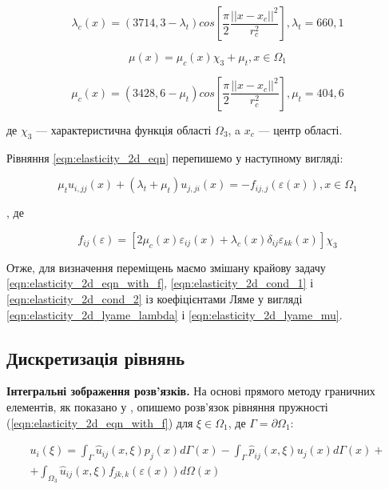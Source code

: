 \begin{equation*}
    \lambda_c(x) = (3714,3 - \lambda_t)cos\left[\frac{\pi}{2}\frac{||x-x_c||^2}{r_c^2}\right], \lambda_t = 660,1
\end{equation*}

\begin{equation}
    \label{eqn:elasticity_2d_lyame_mu}
    \mu(x) = \mu_c(x)\chi_3 + \mu_t, x \in \Omega_1
\end{equation}

\begin{equation*}
    \mu_c(x) = (3428,6 - \mu_t)cos\left[\frac{\pi}{2}\frac{||x-x_c||^2}{r_c^2}\right], \mu_t = 404,6
\end{equation*}

\noindent де $\chi_3$ --- характеристична функція області $\Omega_3$, a $x_c$ --- центр області.

Рівняння \ref{eqn:elasticity_2d_eqn} перепишемо у наступному вигляді:

\begin{equation}
    \label{eqn:elasticity_2d_eqn_with_f}
    \mu_t u_{i,jj}(x) + (\lambda_t + \mu_t)u_{j,ji}(x) = -f_{ij,j}(\varepsilon(x)), x \in \Omega_1
\end{equation}

\noindent, де

\begin{equation*}
    f_{ij}(\varepsilon) = [ 2\mu_c(x)\varepsilon_{ij}(x) + \lambda_c(x) \delta_{ij} \varepsilon_{kk}(x) ] \chi_3
\end{equation*}

Отже, для визначення переміщень маємо змішану крайову задачу \ref{eqn:elasticity_2d_eqn_with_f},
\ref{eqn:elasticity_2d_cond_1} і \ref{eqn:elasticity_2d_cond_2} із коефіцієнтами Ляме у вигляді
\ref{eqn:elasticity_2d_lyame_lambda} і \ref{eqn:elasticity_2d_lyame_mu}.

\subsection{Дискретизація рівнянь}

\textbf{Інтегральні зображення розв'язків.} На основі прямого методу граничних елементів, як показано у
\cite{brebbia-bem}, опишемо розв'язок рівняння пружності (\ref{eqn:elasticity_2d_eqn_with_f}) для $\xi \in \Omega_1$, де
$\Gamma = \partial\Omega_1$:

\begin{equation}
    \label{eqn:elasticity_2d_bem_direct_elasticity}
    \begin{split}
    u_i(\xi) = \int_{\Gamma}\hat{u}_{ij}(x,\xi)p_j(x)d\Gamma(x) - \int_{\Gamma}\hat{p}_{ij}(x,\xi)u_j(x)d\Gamma(x) + \\  
        + \int_{\Omega_3} \hat{u}_{ij}(x,\xi)f_{jk,k}(\varepsilon(x))d\Omega(x)
    \end{split}
\end{equation}

